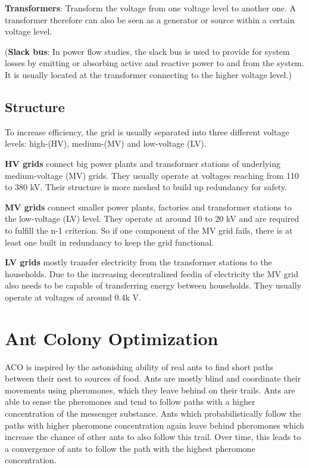 \textbf{Transformers}: Transform the voltage from one voltage level to another one. A transformer therefore can also be seen as a generator or source within a certain voltage level.

(\textbf{Slack bus}: In power flow studies, the slack bus is used to provide for system losses by emitting or absorbing active and reactive power to and from the system. It is usually located at the transformer connecting to the higher voltage level.)

\subsection{Structure}
To increase efficiency, the grid is usually separated into three different voltage levels: high-(HV), medium-(MV) and low-voltage (LV).

\textbf{HV grids} connect big power plants and transformer stations of underlying medium-voltage (MV) grids. They usually operate at voltages reaching from 110 to 380 kV. Their structure is more meshed to build up redundancy for safety.

\textbf{MV grids} connect smaller power plants, factories and transformer stations to the low-voltage (LV) level. They operate at around 10 to 20 kV and are required to fulfill the n-1 criterion. So if one component of the MV grid fails, there is at least one built in redundancy to keep the grid functional.

\textbf{LV grids} mostly transfer electricity from the transformer stations to the households. Due to the increasing decentralized feedin of electricity the MV grid also needs to be capable of transferring energy between households. They usually operate at voltages of around 0.4k V.\\



%

\section{Ant Colony Optimization}
ACO is inspired by the astonishing ability of real ants to find short paths between their nest to sources of food. Ants are mostly blind and coordinate their movements using pheromones, which they leave behind on their trails. Ants are able to sense the pheromones and tend to follow paths with a higher concentration of the messenger substance. Ants which probabilistically follow the paths with higher pheromone concentration again leave behind pheromones which increase the chance of other ants to also follow this trail. Over time, this leads to a convergence of ants to follow the path with the highest pheromone concentration.

